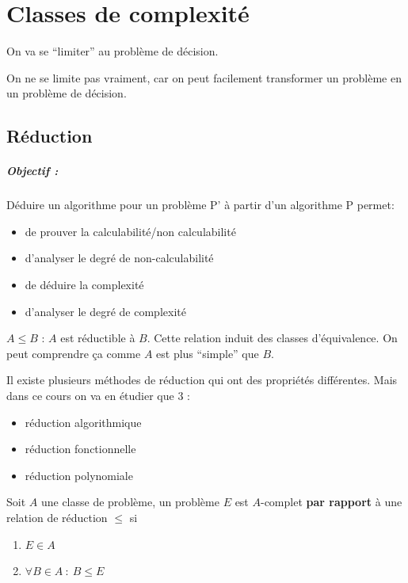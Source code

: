 
\chapter{Classes de complexité}
\label{sec:classes_de_complexit_}
On va se ``limiter'' au problème de décision.

\begin{myrem}
	On ne se limite pas vraiment, car on
	peut facilement transformer un problème en un problème de décision.
\end{myrem}

\section{Réduction}
\label{sub:r_duction}

\paragraph{Objectif :} Déduire un algorithme pour un problème P' à partir d'un
algorithme P permet:
\begin{itemize}
	\item de prouver la calculabilité/non calculabilité
	\item d'analyser le degré de non-calculabilité
	\item de déduire la complexité
	\item d'analyser le degré de complexité
\end{itemize}

\begin{mydef}
	$A \leq B$ : $A$ est réductible à $B$. Cette relation induit des classes
	d'équivalence. On peut comprendre ça comme $A$ est plus ``simple'' que $B$.
\end{mydef}

Il existe plusieurs méthodes de réduction qui ont des propriétés différentes.
Mais dans ce cours on va en étudier
que 3 :
\begin{itemize}
	\item réduction algorithmique
	\item réduction fonctionnelle
	\item réduction polynomiale
\end{itemize}

\begin{mydef}[$A$-complet]
	Soit $A$ une classe de problème, un problème $E$ est $A$-complet
	\textbf{par rapport} à une relation de réduction $\leq$ si
	\begin{enumerate}
		\item $E \in A$
		\item $\forall B \in A \ : \ B \leq E$
	\end{enumerate}
\end{mydef}

